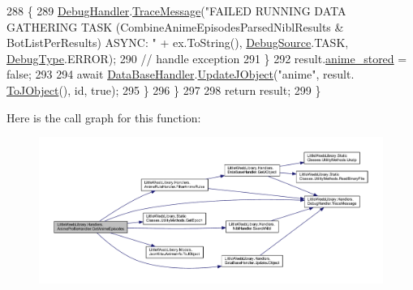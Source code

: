 \begin{DoxyCode}
288                     \{
289                         \mbox{\hyperlink{class_little_weeb_library_1_1_handlers_1_1_anime_profile_handler_a0b0ae3c3838d26351485e6dfc566a632}{DebugHandler}}.\mbox{\hyperlink{interface_little_weeb_library_1_1_handlers_1_1_i_debug_handler_a2e405bc3492e683cd3702fae125221bc}{TraceMessage}}(\textcolor{stringliteral}{"FAILED RUNNING DATA GATHERING
       TASK (CombineAnimeEpisodesParsedNiblResults & BotListPerResults) ASYNC: "} + ex.ToString(), 
      \mbox{\hyperlink{namespace_little_weeb_library_1_1_handlers_a2a6ca0775121c9c503d58aa254d292be}{DebugSource}}.TASK, \mbox{\hyperlink{namespace_little_weeb_library_1_1_handlers_ab66019ed40462876ec4e61bb3ccb0a62}{DebugType}}.ERROR);
290                         \textcolor{comment}{// handle exception}
291                     \}
292                     result.\mbox{\hyperlink{class_little_weeb_library_1_1_models_1_1_json_kitsu_anime_info_a11190c3959e72a4b3b9fdd482de156cb}{anime\_stored}} = \textcolor{keyword}{false};
293 
294                     await \mbox{\hyperlink{class_little_weeb_library_1_1_handlers_1_1_anime_profile_handler_a4764b15d1f2aaf7d21aa461508a08a62}{DataBaseHandler}}.\mbox{\hyperlink{interface_little_weeb_library_1_1_handlers_1_1_i_data_base_handler_a00c429576be33aa60bdf1a88edaf88c6}{UpdateJObject}}(\textcolor{stringliteral}{"anime"}, result.
      \mbox{\hyperlink{class_little_weeb_library_1_1_models_1_1_json_kitsu_anime_info_a2c92ffb7d523c4f75497988156b64b7b}{ToJObject}}(), id, \textcolor{keyword}{true});
295                 \}
296             \}          
297 
298             \textcolor{keywordflow}{return} result;
299         \}
\end{DoxyCode}
Here is the call graph for this function\+:\nopagebreak
\begin{figure}[H]
\begin{center}
\leavevmode
\includegraphics[width=350pt]{class_little_weeb_library_1_1_handlers_1_1_anime_profile_handler_a5b163eb7e68b1e40904fa55454d8ba54_cgraph}
\end{center}
\end{figure}
